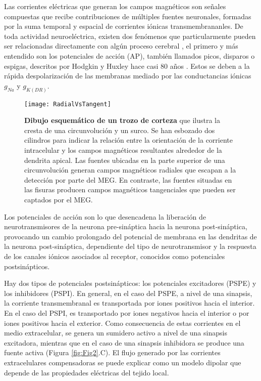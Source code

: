 \documentclass[11pt,letterpaper]{article}
\numberwithin{equation}{subsection}
\numberwithin{table}{subsection}
\begin{document}
\bigskip
\noindent Las corrientes eléctricas que generan los campos magnéticos son señales compuestas que recibe contribuciones de múltiples fuentes neuronales, formadas por la suma temporal y espacial de corrientes iónicas transmembrananles. De toda actividad neuroeléctrica, existen dos fenómenos que particularmente pueden ser relacionadas directamente con algún proceso cerebral \cite{niedermeyer2005electroencephalography}, el primero y más entendido son los potenciales de acción (AP), también llamados picos, disparos o espigas, descritos por Hodgkin y Huxley hace casi 80 años \cite{HodgkinA.L.andHuxley1939, Chappell2020}. Estos se deben a la rápida despolarización de las membranas mediado por las conductancias iónicas $g_{Na}$ y $g_{K(DR)}$. 



\begin{figure}[H]
\centering
	\texttt{[image: RadialVsTangent]}
	\captionsetup{labelfont=bf}
	\caption{\scriptsize \textbf{Dibujo esquemático de un trozo de corteza} que ilustra la cresta de una circunvolución y un surco. Se han esbozado dos cilindros para indicar la relación entre la orientación de la corriente intracelular y los campos magnéticos resultantes alrededor de la dendrita apical. Las fuentes ubicadas en la parte superior de una circunvolución generan campos magnéticos radiales que escapan a la detección por parte del MEG. En contraste, las fuentes situadas en las fisuras producen campos magnéticos tangenciales que pueden ser captados por el MEG.} 
	\label{fig:Fig3}
\end{figure}

\bigskip
\noindent Los potenciales de acción son lo que desencadena la liberación de neurotransmisores de la neurona pre-sináptica hacia la neurona post-sináptica, provocando un cambio prolongado del potencial de membrana en las dendritas de la neurona post-sináptica, dependiente del tipo de neurotransmisor y la respuesta de los canales iónicos asociados al receptor, conocidos como potenciales postsinápticos.

\bigskip
\noindent Hay dos tipos de potenciales postsinápticos: los potenciales excitadores (PSPE) y los inhibidores (PSPI). En general, en el caso del PSPE, a nivel de una sinapsis, la corriente transmembranal es transportada por iones positivos hacia el interior. En el caso del PSPI, es transportado por iones negativos hacia el interior o por iones positivos hacia el exterior. Como consecuencia de estas corrientes en el medio extracelular, se genera un sumidero activo a nivel de una sinapsis excitadora, mientras que en el caso de una sinapsis inhibidora se produce una fuente activa (Figura \ref{fig:Fig2}.C). El flujo generado por las corrientes extracelulares compensadoras se puede explicar como un modelo dipolar que depende de las propiedades eléctricas del tejido local. 
\end{document}
